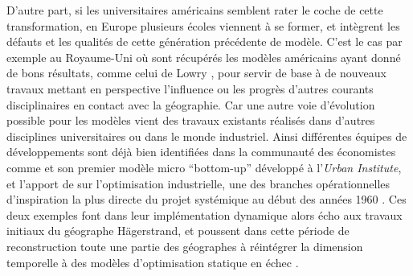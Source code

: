 D'autre part, si les universitaires américains semblent rater le coche de cette transformation, en Europe plusieurs écoles viennent à se former, et intègrent les défauts et les qualités de cette génération précédente de modèle. C'est le cas par exemple au Royaume-Uni où sont récupérés les modèles américains ayant donné de bons résultats, comme celui de Lowry \autocite{Lowry1964}, pour servir de base à de nouveaux travaux mettant en perspective l'influence ou les progrès d'autres courants disciplinaires en contact avec la géographie. Car une autre voie d'évolution possible pour les modèles vient des travaux existants réalisés dans d'autres disciplines universitaires ou dans le monde industriel. Ainsi différentes équipes de développements sont déjà bien identifiées dans la communauté des économistes comme \textcite{Orcutt1957} et son premier modèle micro \foreignquote{english}{bottom-up} développé à l'\textit{Urban Institute}, et l'apport de \textcite{Forrester1961,Forrester1969} sur l'optimisation industrielle, une des branches opérationnelles d'inspiration la plus directe du projet systémique au début des années 1960 \autocites{Cohen1961}[911]{Shubik1960b}. Ces deux exemples font dans leur implémentation dynamique alors écho aux travaux initiaux du géographe Hägerstrand, et poussent dans cette période de reconstruction toute une partie des géographes à réintégrer la dimension temporelle à des modèles d'optimisation statique en échec \autocite[p295]{Batty1976}.


